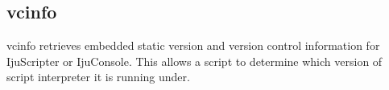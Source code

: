 \subsection{vcinfo}

\begin{tclcommandname}{vcinfo}%
retrieves embedded static version and version control information for 
IjuScripter or IjuConsole.
This allows a script to determine which version of script interpreter it is
running under.
\end{tclcommandname}

\begin{tclcommandsynopsis}
\end{tclcommandsynopsis}

